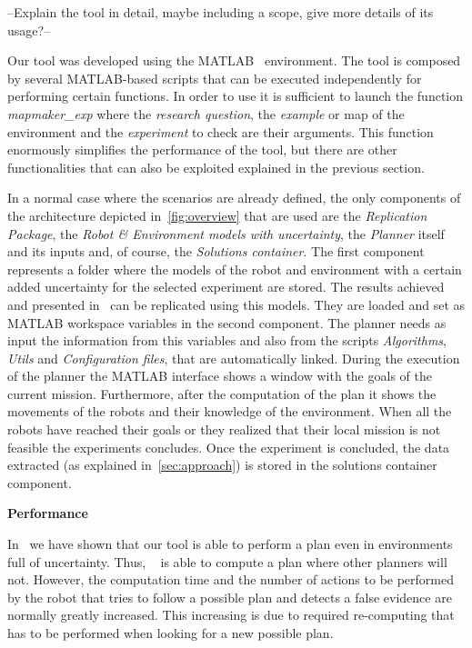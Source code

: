 --Explain the tool in detail, maybe including a scope, give more details of its usage?-- 

Our tool was developed using the MATLAB~\cite{matlab} environment.
The tool is composed by several MATLAB-based scripts that can be executed independently for performing certain functions.
In order to use \toolName it is sufficient to launch the function \emph{mapmaker\_exp} where the \emph{research question}, the \emph{example} or map of the environment and the \emph{experiment} to check are their arguments.
This function enormously simplifies the performance of the tool, but there are other functionalities that can also be exploited explained in the previous section.

In a normal case where the scenarios are already defined, the only components of the architecture depicted in~\ref{fig:overview} that are used are the \emph{Replication Package}, the \emph{Robot \& Environment models with uncertainty}, the \emph{Planner} itself and its inputs and, of course, the \emph{Solutions container}.
The first component represents a folder where the models of the robot and environment with a certain added uncertainty for the selected experiment are stored.
The results achieved and presented in~\cite{mapmaker17} can be replicated using this models.
They are loaded and set as MATLAB workspace variables in the second component.
The planner needs as input the information from this variables and also from the scripts \emph{Algorithms}, \emph{Utils} and \emph{Configuration files}, that are automatically linked.
During the execution of the planner  the MATLAB interface shows a window with the goals of the current mission. 
Furthermore, after the computation of the plan it shows the movements of the robots and their knowledge of the environment.
When all the robots have reached their goals or they realized that their local mission is not feasible the experiments concludes.
Once the experiment is concluded, the data extracted (as explained in~\ref{sec:approach}) is stored in the solutions container component.

\textbf{Performance}

In~\cite{mapmaker17}  we have shown that our tool is able to perform a plan even in environments full of uncertainty.
Thus, \toolName~ is able to compute a plan where other planners will not.
However, the computation time and the number of actions to be performed by the robot that tries to follow a possible plan and detects a false evidence are normally greatly increased.
This increasing is due to required re-computing that has to be performed when looking for a new possible plan.

